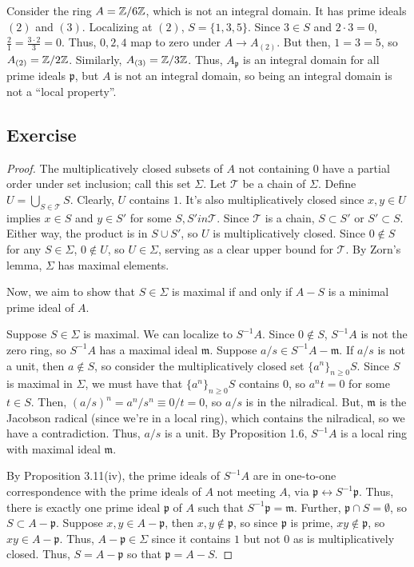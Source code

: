 Consider the ring $A = \mathbb{Z}/6\mathbb{Z}$, which is not an integral domain. It has prime ideals $(2)$ and $(3)$. Localizing at $(2)$, $S = \{1,3,5\}$. Since
$3 \in S$ and $2 \cdot 3 = 0$, $\frac{2}{1} = \frac{3\cdot 2}{3} = 0$. Thus, $0,2,4$ map to zero under $A \to A_{(2)}$. But then, $1=3=5$, so 
$A_{(2)} = \mathbb{Z}/2\mathbb{Z}$. Similarly, $A_{(3)} = \mathbb{Z}/3\mathbb{Z}$. Thus, $A_\mathfrak{p}$ is an integral domain for all prime ideals $\mathfrak{p}$, but $A$ is not
an integral domain, so being an integral domain is not a ``local property''.

\subsection{Exercise}\label{3.6}

\begin{proof}
The multiplicatively closed subsets of $A$ not containing $0$ have a partial order under set inclusion; call this set $\Sigma$. Let $\mathcal{T}$ be a chain of $\Sigma$. 
Define $U = \bigcup_{S \in \mathcal{T}} S$. Clearly, $U$ contains $1$. It's also multiplicatively closed since $x,y \in U$ implies $x \in S$ and $y \in S'$ for some $S,S' in \mathcal{T}$. Since 
$\mathcal{T}$ is a chain, $S \subset S'$ or $S' \subset S$. Either way, the product is in $S \cup S'$, so $U$ is multiplicatively closed. Since $0 \not\in S$ for any $S \in \Sigma$, $0 \not\in U$,
so $U \in \Sigma$, serving as a clear upper bound for $\mathcal{T}$. By Zorn's lemma, $\Sigma$ has maximal elements.

Now, we aim to show that $S \in \Sigma$ is maximal if and only if $A - S$ is a minimal prime ideal of $A$. 

Suppose $S \in \Sigma$ is maximal. We can localize to $S^{-1}A$. Since $0 \not\in S$, $S^{-1}A$ is not the zero ring, so $S^{-1}A$ has a maximal ideal $\mathfrak{m}$. Suppose $a/s \in S^{-1}A - \mathfrak{m}$.
If $a/s$ is not a unit, then $a \not\in S$, so consider the multiplicatively closed set $\{a^n\}_{n\ge 0}S$. Since $S$ is maximal in $\Sigma$, we must have that $\{a^n\}_{n\ge 0}S$ contains $0$, so 
$a^n t = 0$ for some $t \in S$. Then, $(a/s)^n = a^n/s^n \equiv 0/t = 0$, so $a/s$ is in the nilradical. But, $\mathfrak{m}$ is the Jacobson radical (since we're in a local ring), which contains the nilradical, 
so we have a contradiction. Thus, $a/s$ is a unit. By Proposition 1.6, $S^{-1}A$ is a local ring with maximal ideal $\mathfrak{m}$.

By Proposition 3.11(iv), the prime ideals of $S^{-1}A$ are in one-to-one correspondence with the prime ideals of $A$ not meeting $A$, via $\mathfrak{p} \leftrightarrow S^{-1}\mathfrak{p}$. Thus, there is exactly
one prime ideal $\mathfrak{p}$ of $A$ such that $S^{-1}\mathfrak{p} = \mathfrak{m}$. Further, $\mathfrak{p} \cap S = \emptyset$, so $S \subset A - \mathfrak{p}$. Suppose $x,y \in A - \mathfrak{p}$, then $x,y \not\in \mathfrak{p}$,
so since $\mathfrak{p}$ is prime, $xy \not\in \mathfrak{p}$, so $xy \in A - \mathfrak{p}$. Thus, $A - \mathfrak{p} \in \Sigma$ since it contains $1$ but not $0$ as is multiplicatively closed. Thus, $S = A - \mathfrak{p}$
so that $\mathfrak{p} = A - S$.


\end{proof}
